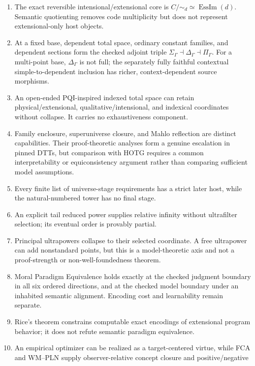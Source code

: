 \documentclass[11pt]{article}
\theoremstyle{definition}
\theoremstyle{remark}
\begin{document}
\begin{enumerate}
  the HOTG family-enclosure theorem are checked; their concrete contextual
  composition remains open.
\item The exact reversible intensional/extensional core is
  $C/{\sim_d}\simeq\operatorname{EssIm}(d)$.  Semantic quotienting removes
  code multiplicity but does not represent extensional-only host objects.
\item At a fixed base, dependent total space, ordinary constant families, and
  dependent sections form the checked adjoint triple
  $\Sigma_\Gamma\dashv\Delta_\Gamma\dashv\Pi_\Gamma$.  For a multi-point
  base, $\Delta_\Gamma$ is not full; the separately fully faithful contextual
  simple-to-dependent inclusion has richer, context-dependent source morphisms.
\item An open-ended PQI-inspired indexed total space can retain
  physical/extensional, qualitative/intensional, and indexical coordinates
  without collapse.  It carries no exhaustiveness component.
\item Family enclosure, superuniverse closure, and Mahlo reflection are distinct
  capabilities.  Their proof-theoretic analyses form a genuine escalation in
  pinned DTTs, but comparison with HOTG requires a common interpretability or
  equiconsistency argument rather than comparing sufficient model assumptions.
\item Every finite list of universe-stage requirements has a strict later host,
  while the natural-numbered tower has no final stage.
\item An explicit tail reduced power supplies relative infinity without
  ultrafilter selection; its eventual order is provably partial.
\item Principal ultrapowers collapse to their selected coordinate.  A free
  ultrapower can add nonstandard points, but this is a model-theoretic axis and
  not a proof-strength or non-well-foundedness theorem.
\item Moral Paradigm Equivalence holds exactly at the checked judgment boundary
  in all six ordered directions, and at the checked model boundary under an
  inhabited semantic alignment.  Encoding cost and learnability remain separate.
\item Rice's theorem constrains computable exact encodings of extensional
  program behavior; it does not refute semantic paradigm equivalence.
\item An empirical optimizer can be realized as a target-centered virtue, while
  FCA and WM--PLN supply observer-relative concept closure and positive/negative

\end{enumerate}
\end{document}
